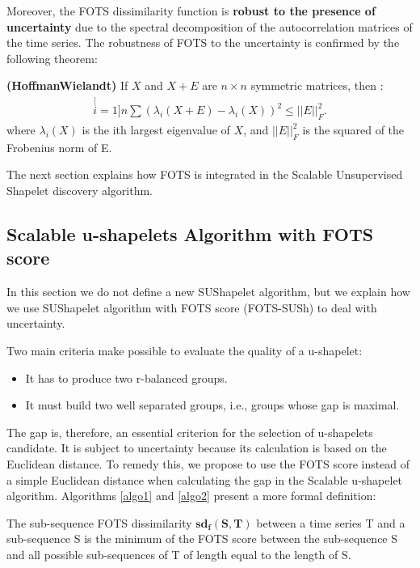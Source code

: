   Moreover, the FOTS dissimilarity function is \textbf{robust to the presence of
  uncertainty} due to the spectral decomposition of the autocorrelation matrices of the time series. The robustness of FOTS to the uncertainty is confirmed by the following theorem:   

\begin{theorem}
\textbf{(Hoffman\-Wielandt)} \cite{Bhatia1993} If $X$ and $X + E$ are $n \times
n$ symmetric matrices, then : 
\begin{eqnarray}
\stackrel[i=1]{n}{\sum}(\lambda_{i}(X+E)-\lambda_{i}(X))^{2}\leq||E||_{F}^{2}.
\end{eqnarray}
where $\lambda_i(X)$ is the ith largest eigenvalue of $X$, and $||E||_{F}^{2}$
is the squared of the Frobenius norm of E.
\end{theorem}

The next section explains how FOTS is integrated in the Scalable Unsupervised Shapelet discovery algorithm.


\subsection{Scalable u-shapelets Algorithm with FOTS score}
In this section we do not define a new SUShapelet algorithm, but we explain how we use SUShapelet algorithm with FOTS score (FOTS-SUSh) to deal with uncertainty.


 Two main criteria make  possible to evaluate the quality of a u-shapelet:
\begin{itemize}
  \item It has to produce two r-balanced groups.
  \item It must build two well separated groups, i.e., groups whose gap is
  maximal.
\end{itemize}

The gap is, therefore, an essential criterion for the selection of u-shapelets candidate. It is subject to uncertainty because its calculation is based on the
Euclidean distance. To remedy this, we propose to use the FOTS score instead of
a simple Euclidean distance when calculating the gap in the Scalable u-shapelet algorithm. Algorithms \ref{algo1} and \ref{algo2} present a more formal definition:    


 \begin{definition}
The sub-sequence FOTS dissimilarity $\boldsymbol{sd_f(S, T)}$ between
a time series T and a sub-sequence S is the minimum of the FOTS
score between the sub-sequence S and all possible
sub-sequences of T of length equal to the length of S.
\end{definition}



